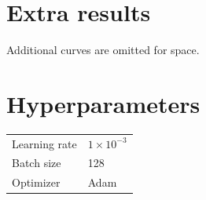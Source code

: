 \section{Extra results}\label{app:extra}
Additional curves are omitted for space.

\section{Hyperparameters}\label{app:hparams}
\begin{tabular}{ll}
Learning rate & $1\times10^{-3}$ \\
Batch size & 128 \\
Optimizer & Adam \\
\end{tabular}
